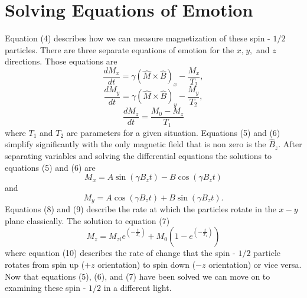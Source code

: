 \documentclass[twocolumn]{article}
\begin{document}
\section*{Solving Equations of Emotion}
Equation (4) describes how we can measure magnetization of these spin - $1/2$ particles. There are three separate equations of emotion for the $x,\hspace{1pt}y,$ and $z$ directions. Those equations are
\begin{equation}
\frac{dM_{x}}{dt}=\gamma(\hat{M}\times\hat{B})_{x}-\frac{M_{x}}{T_{2}},
\end{equation}
\begin{equation}
\frac{dM_{y}}{dt}=\gamma(\hat{M}\times\hat{B})_{y}-\frac{M_{y}}{T_{2}},
\end{equation}
\begin{equation}
\frac{dM_{z}}{dt}=\frac{M_{0}-M_{z}}{T_{1}}
\end{equation}
where $T_1$ and $T_2$ are parameters for a given situation. Equations (5) and (6) simplify significantly with the only magnetic field that is non zero is the $\hat{B}_z$. After separating variables and solving the differential equations the solutions to equations (5) and (6) are
\begin{equation}
M_{x}=A\sin{(\gamma B_{z}t)}-B\cos{(\gamma B_{z}t)}
\end{equation}
and
\begin{equation}
M_{y}=A\cos{(\gamma B_{z}t)}+B\sin{(\gamma B_{z}t)}.
\end{equation}
Equations (8) and (9) describe the rate at which the particles rotate in the $x-y$ plane classically. The solution to equation (7)
\begin{equation}
M_{z}=M_{zi}e^{(-\frac{t}{T_1})}+M_{0}(1-e^{(-\frac{t}{T_1})})
\end{equation}
where equation (10) describes the rate of change that the spin - $1/2$ particle rotates from spin up ($+z$ orientation) to spin down ($-z$ orientation) or vice versa. Now that equations (5), (6), and (7) have been solved we can move on to examining these spin - $1/2$ in a different light.
\end{document}
